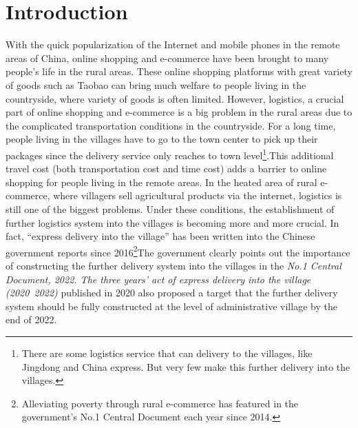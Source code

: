 \documentclass{article}
\begin{document}
\section{Introduction}
With the quick popularization of the Internet and mobile phones in the remote areas of China, online shopping and e-commerce have been brought to many people’s life in the rural areas. These online shopping platforms with great variety of goods such as Taobao can bring much welfare to people living in the countryside, where variety of goods is often limited. However, logistics, a crucial part of online shopping and e-commerce is a big problem in the rural areas due to the complicated transportation conditions in the countryside. For a long time, people living in the villages have to go to the town center to pick up their packages since the delivery service only reaches to town level\footnote{There are some logistics service that can delivery to the villages, like Jingdong and China express. But very few make this further delivery into the villages.}.This additional travel cost (both transportation cost and time cost) adds a barrier to online shopping for people living in the remote areas. In the heated area of rural e-commerce, where villagers sell agricultural products via the internet, logistics is still one of the biggest problems. Under these conditions, the establishment of further logistics system into the villages is becoming more and more crucial. In fact, “express delivery into the village” has been written into the Chinese government reports since 2016\footnote{Alleviating poverty through rural e-commerce has featured in the government’s No.1 Central Document each year since 2014.}The government clearly points out the importance of constructing the further delivery system into the villages in the {\it No.1 Central Document, 2022. The three years’ act of express delivery into the village (2020~2022)} published in 2020 also proposed a target that the further delivery system should be fully constructed at the level of administrative village by the end of 2022. \\
\mbox{\hspace{2em}}
\end{document}
